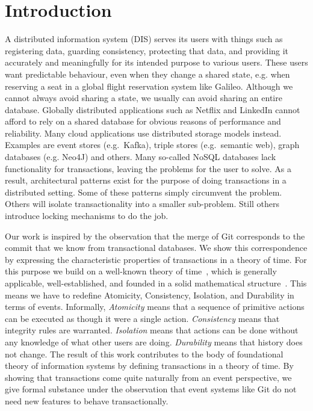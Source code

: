 \documentclass{elsarticle}
\begin{document}
\section{Introduction}
\label{sct:Introduction}
	A distributed information system (DIS) serves its users with things such as
	registering data, guarding consistency, protecting that data,
	and providing it accurately and meaningfully for its intended purpose to various users.
	These users want predictable behaviour, even when they change a shared state,
	e.g. when reserving a seat in a global flight reservation system like Galileo.
	Although we cannot always avoid sharing a state,
	we usually can avoid sharing an entire database.
	Globally distributed applications such as Netflix and LinkedIn cannot afford to rely on a shared database for obvious reasons of performance and reliability.
	Many cloud applications use distributed storage models instead.
	Examples are event stores (e.g.\ Kafka), triple stores (e.g.\ semantic web), graph databases (e.g. Neo4J) and others.
	Many so-called NoSQL databases lack functionality for transactions,
	leaving the problems for the user to solve.
	As a result, architectural patterns exist for the purpose of doing transactions in a distributed setting.
	Some of these patterns simply circumvent the problem.
	Others will isolate transactionality into a smaller sub-problem.
	Still others introduce locking mechanisms to do the job.

	Our work is inspired by the observation that the merge of Git corresponds to the commit that we know from transactional databases.
	We show this correspondence by expressing the characteristic properties of transactions in a theory of time.
	For this purpose we build on a well-known theory of time~\cite{DBLP:journals/ipl/FosterCWZ18},
	which is generally applicable,
	well-established, and founded in a solid mathematical structure~\cite{Foster14}.
	This means we have to redefine Atomicity, Consistency, Isolation, and Durability in terms of events.
	Informally, {\em Atomicity} means that a sequence of primitive actions can be executed as though it were a single action.
	{\em Consistency} means that integrity rules are warranted.
	{\em Isolation} means that actions can be done without any knowledge of what other users are doing.
	{\em Durability} means that history does not change.
	The result of this work contributes to the body of foundational theory of information systems
	by defining transactions in a theory of time.
	By showing that transactions come quite naturally from an event perspective,
	we give formal substance under the observation that event systems like Git do not need new features to behave transactionally.
\end{document}
